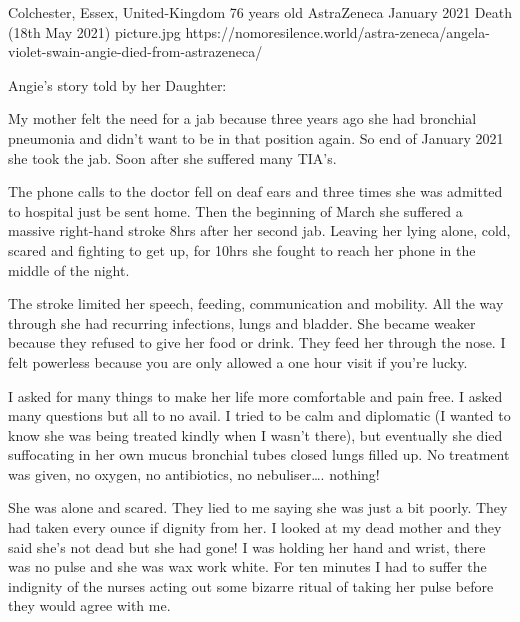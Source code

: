 {Colchester, Essex, United-Kingdom}
{76 years old}
{AstraZeneca}
{January 2021}
{Death (18th May 2021)}
{picture.jpg}
{https://nomoresilence.world/astra-zeneca/angela-violet-swain-angie-died-from-astrazeneca/}
{

Angie’s story told by her Daughter:

My mother felt the need for a jab because three years ago she had bronchial
pneumonia and didn’t want to be in that position again. So end of January 2021
she took the jab. Soon after she suffered many TIA’s.

The phone calls to the doctor fell on deaf ears and three times she was admitted
to hospital just be sent home. Then the beginning of March she suffered a
massive right-hand stroke 8hrs after her second jab. Leaving her lying alone,
cold, scared and fighting to get up, for 10hrs she fought to reach her phone in
the middle of the night.

The stroke limited her speech, feeding, communication and mobility. All the way
through she had recurring infections, lungs and bladder. She became weaker
because they refused to give her food or drink. They feed her through the
nose. I felt powerless because you are only allowed a one hour visit if you’re
lucky.

I asked for many things to make her life more comfortable and pain free. I asked
many questions but all to no avail. I tried to be calm and diplomatic (I wanted
to know she was being treated kindly when I wasn’t there), but eventually she
died suffocating in her own mucus bronchial tubes closed lungs filled up. No
treatment was given, no oxygen, no antibiotics, no nebuliser…. nothing!

She was alone and scared. They lied to me saying she was just a bit poorly. They
had taken every ounce if dignity from her. I looked at my dead mother and they
said she’s not dead but she had gone! I was holding her hand and wrist, there
was no pulse and she was wax work white. For ten minutes I had to suffer the
indignity of the nurses acting out some bizarre ritual of taking her pulse
before they would agree with me.

}
